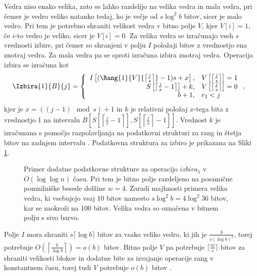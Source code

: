Vedra niso enako velika, zato se lahko razdelijo na velika vedra in mala vedra, pri čemer je vedro veliko natanko tedaj, ko je večje od $s\log^2 b$ bitov, sicer je malo vedro. Pri tem je potrebno shraniti velikost vedra v bitno polje $V$, kjer $V[i]=1$, če $i$-to vedro je veliko, sicer je $V[i]=0$. Za velika vedra se izračunajo vseh $s$ vrednosti izbire, pri čemer so shranjeni v polju $I$ položaji bitov z vrednostjo ena znotraj vedra. Za mala vedra pa se sproti izračuna izbira znotraj vedra. Operacija izbira se izračuna kot
\begin{equation*}
    \Izbira{1}{B}{j}=\left\{
    \begin{array}{rl}
       I\left[(\Rang{1}{V}{\left\lceil \frac{j}{s} \right\rceil}-1)s+x\right], & V\left[\left\lceil \frac{j}{s} \right\rceil\right] = 1\\ 
       S\left[\left\lceil \frac{j}{s} -1 \right\rceil\right] + k, & V\left[\left\lceil \frac{j}{s} \right\rceil\right] = 0\\
       b+1, & r_1 < j
    \end{array}\right.,
\end{equation*}
kjer je $x = ((j-1) \mod{s})+1$ in $k$ je relativni položaj $x$-tega bita z vrednostjo 1 na intervalu $B\left[ S\left[\left\lceil \frac{j}{s} -1 \right\rceil\right], S\left[\left\lceil \frac{j}{s} \right\rceil-1\right]\right]$. Vrednost $k$ je izračunana s pomočjo razpolavljanja na podatkovni strukturi za rang in štetja bitov na zadnjem intervalu \cite{Navarro2016}. Podatkovna struktura za izbiro je prikazana na Sliki \ref{fig:select}.

\begin{figure}[htb]
    \begin{center}
        
        \caption{Primer dodatne podatkovne strukture za operacijo $izbira_1$ v $O(\log\log{n})$ času. Pri tem je bitno polje razdeljeno na posamične pomnilniške besede dolžine $w=4$. Zaradi majhnosti primera velika vedra, ki vsebujejo vsaj 10 bitov namesto $s\log^2b= 4\log^2{36}$ bitov, kar se zaokroži na 100 bitov. Velika vedra so označena v bitnem polju s sivo barvo.} 
        \label{fig:select}
    \end{center}
\end{figure}

Polje $I$ mora shraniti $s\lceil\log b\rceil$ bitov za vsako veliko vedro, ki jih je $\frac{b}{s(\log b)^2}$, torej potrebuje $O\left(\left\lceil\frac{b}{\log b}\right\rceil\right)=o(b)$ bitov. Bitno polje $V$ pa potrebuje $\lceil \frac{m}{s} \rceil$ bitov za shraniti velikosti blokov in dodatne bite za izvajanje operacije rang v konstantnem času, torej tudi $V$ potrebuje $o(b)$ bitov \cite{Navarro2016}.

